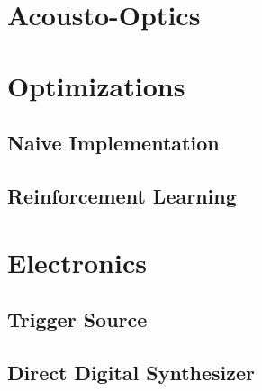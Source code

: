 \chapter{Acousto-Optics}

\chapter{Optimizations}
\section{Naive Implementation}
\section{Reinforcement Learning}

\chapter{Electronics}
\section{Trigger Source}
\section{Direct Digital Synthesizer}

